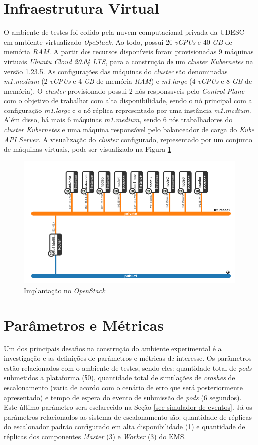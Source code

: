 \section{Infraestrutura Virtual}
O ambiente de testes foi cedido pela nuvem computacional privada da UDESC em ambiente virtualizado \textit{OpeStack}. Ao todo, possui 20 \textit{vCPUs} e 40 \textit{GB} de memória \textit{RAM}. A partir dos recursos disponíveis foram provisionadas 9 máquinas virtuais \textit{Ubuntu Cloud 20.04 LTS}, para  a construção de um \textit{cluster} \textit{Kubernetes} na versão 1.23.5. As configurações das máquinas do \textit{cluster} são denominadas \textit{m1.medium} (2 \textit{vCPUs} e 4 \textit{GB} de memória \textit{RAM}) e \textit{m1.large} (4 \textit{vCPUs} e 8 \textit{GB} de memória). O \textit{cluster} provisionado possui  2 nós responsáveis pelo \textit{Control Plane} com o objetivo de trabalhar com alta disponibilidade, sendo o nó principal com a configuração \textit{m1.large} e o nó réplica representado por uma instância \textit{m1.medium}. Além disso, há mais 6 máquinas \textit{m1.medium}, sendo 6 nós trabalhadores do \textit{cluster} \textit{Kubernetes} e uma máquina responsável pelo balanceador de carga do \textit{Kube API Server}. A visualização do \textit{cluster} configurado, representado por um conjunto de máquinas virtuais, pode ser visualizado na Figura \ref{fig:openstack}.
\begin{figure}[h!]
	\caption{\label{fig:openstack}Implantação no \textit{OpenStack}}
	\centering
	\includegraphics[width=.7\linewidth]{assets/openstack.png}
\end{figure}

\section{Parâmetros e Métricas}
Um dos principais desafios na construção do ambiente experimental é a investigação e as definições de parâmetros e métricas de interesse. Os parâmetros estão relacionados com o ambiente de testes, sendo eles: quantidade total de \textit{pods} submetidos a plataforma (50), quantidade total de simulações de \textit{crashes} de escalonamento (varia de acordo com o cenário de erro que será posteriormente apresentado) e tempo de espera do evento de submissão de \textit{pods} (6 segundos). Este último parâmetro será esclarecido na Seção \ref{sec-simulador-de-eventos}. Já os parâmetros relacionados ao sistema de escalonamento são: quantidade de réplicas do escalonador padrão configurado em alta disponibilidade (1) e quantidade de réplicas dos componentes \textit{Master} (3) e \textit{Worker} (3) do \ac{KMS}.


